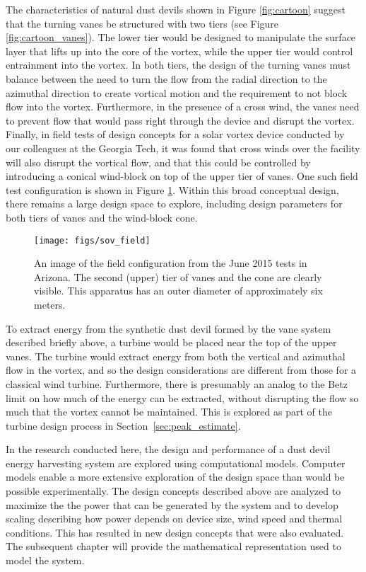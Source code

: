 The characteristics of natural dust devils shown in Figure
\ref{fig:cartoon} suggest that the turning vanes be structured with two
tiers (see Figure \ref{fig:cartoon_vanes}). The lower tier would be
designed to manipulate the surface layer 
that lifts up into the core of the vortex, while the upper tier would
control entrainment into the vortex. In both tiers, the design of the
turning vanes must balance between the need to turn the flow from the
radial direction to the azimuthal direction to create vortical motion
and the requirement to not block flow into the vortex. Furthermore, in
the presence of a cross wind, the vanes need to prevent flow that
would pass right through the device and disrupt the vortex.
Finally, in field tests of design concepts for a solar vortex device
conducted by our colleagues at the Georgia Tech, it was found that cross
winds over the facility will also disrupt the vortical flow, and that
this could be controlled by introducing a conical wind-block on top of
the upper tier of vanes. One such field test configuration is shown in
Figure \ref{fig:field_test}. Within this broad conceptual design, there
remains a large design space to explore, including design parameters for
both tiers of vanes and the wind-block cone.

  \begin{figure}[!htb]
    \begin{center}
     \texttt{[image: figs/sov\_field]}
     \caption{An image of the field configuration from the June 2015
     tests in Arizona. The second (upper) tier of vanes and the cone are
     clearly visible. This apparatus has an outer diameter of
     approximately six meters.}
     \label{fig:field_test}
    \end{center}
  \end{figure}

To extract energy from the synthetic dust devil formed by the vane
system described briefly above, a turbine would be placed near the top
of the upper vanes. The turbine would extract energy from both the
vertical and azimuthal flow in the vortex, and so the design
considerations are different from those for a classical wind turbine.
Furthermore, there is presumably an analog to the Betz limit on how
much of the energy can be extracted, without disrupting the flow so
much that the vortex cannot be maintained. This is explored as part of
the turbine design process in Section~\ref{sec:peak_estimate}. 

In the research conducted here, the design and performance of a dust
devil energy harvesting system are explored using computational
models. Computer models enable a more extensive exploration of
the design space than would be possible experimentally. The design
concepts described above are analyzed to maximize the the
power that can be generated by the system and to develop scaling
describing how power depends on device size, wind speed and thermal
conditions. This has resulted in new design concepts that were also 
evaluated. The subsequent chapter will provide the mathematical
representation used to model the system.  

